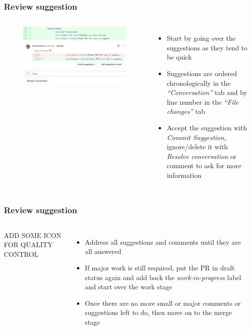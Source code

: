 \documentclass[aspectratio=169]{beamer} %
\begin{document}
\begin{frame}
	\frametitle{Review suggestion}
	\begin{columns}[c]
		
		\vspace{-.75cm}
		\begin{figure}
			\centering
			\includegraphics[width=\textwidth]{./img/review-suggestion-1.png}
		\end{figure}	
		
		\begin{itemize}
			\setlength\itemsep{1em}
			\item Start by going over the suggestions as they tend to be quick  
			\item Suggestions are ordered chronologically in the \textit{``Conversation''} tab and by line number in the \textit{``File changes''} tab
			\item Accept the suggestion with \textit{Commit Suggestion}, ignore/delete it with \textit{Resolve conversation} or comment to ask for more information
		\end{itemize}
		
	\end{columns}
\end{frame}

\begin{frame}
	\frametitle{Review suggestion}
	\begin{columns}[c]
		
		\Large ADD SOME ICON FOR QUALITY CONTROL
		
		\begin{itemize}
			\setlength\itemsep{1em}
			\item Address all suggestions and comments until they are all answered
			\item If major work is still required, put the PR in draft status again and add back the \textit{work-in-progress} label and start over the work stage
			\item Once there are no more small or major comments or suggestions left to do, then move on to the merge stage
		\end{itemize}
		
	\end{columns}
\end{frame}
\end{document}
